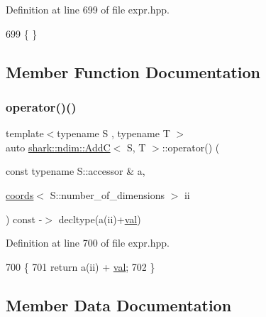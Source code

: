 Definition at line 699 of file expr.\+hpp.


\begin{DoxyCode}
699 \{ \}
\end{DoxyCode}


\subsection{Member Function Documentation}
\hypertarget{classshark_1_1ndim_1_1_add_c_a2bd9d0064119ef2b4cb1bebce43dca3c}{}\label{classshark_1_1ndim_1_1_add_c_a2bd9d0064119ef2b4cb1bebce43dca3c} 
\subsubsection{\texorpdfstring{operator()()}{operator()()}}
{\footnotesize\ttfamily template$<$typename S , typename T $>$ \\
auto \hyperlink{classshark_1_1ndim_1_1_add_c}{shark\+::ndim\+::\+AddC}$<$ S, T $>$\+::operator() (\begin{DoxyParamCaption}\item[{const typename S\+::accessor \&}]{a,  }\item[{\hyperlink{structshark_1_1ndim_1_1coords}{coords}$<$ S\+::number\+\_\+of\+\_\+dimensions $>$}]{ii }\end{DoxyParamCaption}) const -\/$>$ decltype(a(ii)+\hyperlink{classshark_1_1ndim_1_1_add_c_a30bcb1ec409e0b53c65adec49eb2af81}{val}) \hspace{0.3cm}{\ttfamily [inline]}}



Definition at line 700 of file expr.\+hpp.


\begin{DoxyCode}
700                                                                                                            
                   \{
701                 \textcolor{keywordflow}{return} a(ii) + \hyperlink{classshark_1_1ndim_1_1_add_c_a30bcb1ec409e0b53c65adec49eb2af81}{val};
702             \}
\end{DoxyCode}


\subsection{Member Data Documentation}
\hypertarget{classshark_1_1ndim_1_1_add_c_a30bcb1ec409e0b53c65adec49eb2af81}{}\label{classshark_1_1ndim_1_1_add_c_a30bcb1ec409e0b53c65adec49eb2af81} 
